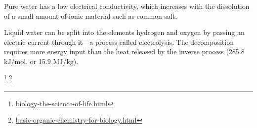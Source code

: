 \documentclass[
]{article}
\let\rmarkdownfootnote\footnote%
\def\footnote{\protect\rmarkdownfootnote}
\renewcommand{\href}[2]{#2\footnote{\url{#1}}}
\theoremstyle{definition}
\theoremstyle{definition}
\theoremstyle{definition}
\theoremstyle{remark}
\begin{document}
Pure water has a low electrical conductivity, which increases with the
dissolution of a small amount of ionic material such as common salt.

Liquid water can be split into the elements hydrogen and oxygen by
passing an electric current through it---a process called electrolysis.
The decomposition requires more energy input than the heat released by
the inverse process (285.8 kJ/mol, or 15.9 MJ/kg).

\href{biology-the-science-of-life.html}{\emph{}}
\href{basic-organic-chemistry-for-biology.html}{\emph{}}
\end{document}
